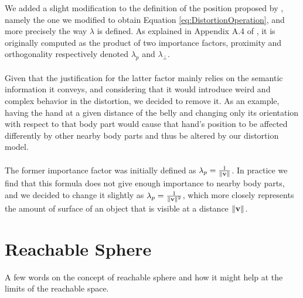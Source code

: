 We added a slight modification to the definition of the position proposed by \cite{molla2017egocentric}, namely the one we modified to obtain Equation \ref{eq:DistortionOperation}, and more precisely the way $\lambda $ is defined. As explained in Appendix A.4 of \cite{molla2016precise}, it is originally computed as the product of two importance factors, proximity and orthogonality respectively denoted $\lambda_p$ and $\lambda_\bot $.
\\\\
Given that the justification for the latter factor mainly relies on the semantic information it conveys, and considering that it would introduce weird and complex behavior in the distortion, we decided to remove it. As an example, having the hand at a given distance of the belly and changing only its orientation with respect to that body part would cause that hand's position to be affected differently by other nearby body parts and thus be altered by our distortion model.
\\\\
The former importance factor was initially defined as $\lambda_p = \frac{1}{\lVert\mathbf{v}\rVert}$. In practice we find that this formula does not give enough importance to nearby body parts, and we decided to change it slightly as $\lambda_p = \frac{1}{\lVert\mathbf{v}\rVert^2}$, which more closely represents the amount of surface of an object that is visible at a distance $\lVert\mathbf{v}\rVert$.

\section{Reachable Sphere}

A few words on the concept of reachable sphere and how it might help at the limits of the reachable space.
